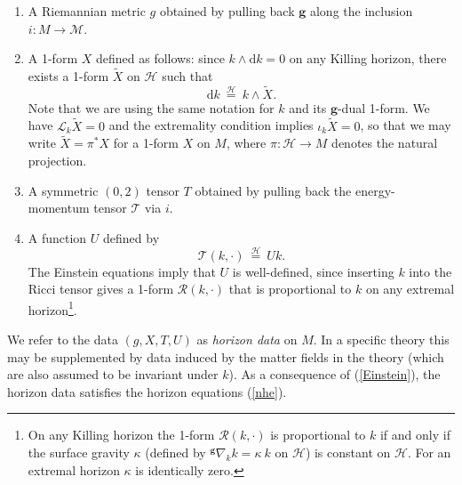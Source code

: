 \documentclass[11pt, reqno]{amsart}
\theoremstyle{plain}
\theoremstyle{definition}
\numberwithin{equation}{section}
\begin{document}
\begin{enumerate}
    \item A Riemannian metric $g$ obtained by pulling back $\textbf{g}$ along the inclusion $i: M \to \mathcal{M}$.
    \item A 1-form $X$ defined as follows: since $k \wedge \text{d}k = 0$ on any Killing horizon, there exists a 1-form $\tilde{X}$ on $\mathcal{H}$ such that 
    \begin{equation}  \label{Xdef}
    \text{d}k \:\overset{\mathcal{H}}{=}\: k \wedge \tilde{X}.
\end{equation}
Note that we are using the same notation for $k$ and its $\textbf{g}$-dual 1-form. We have $\mathcal{L}_k\tilde{X} = 0$ and the extremality condition implies  $\iota_k\tilde{X} = 0$, so that we may write $\tilde{X} = \pi^* X$ for a 1-form $X$ on $M$, where $\pi: \mathcal{H} \to M$ denotes the natural projection.
\item A symmetric $(0,2)$ tensor $T$ obtained by pulling back the energy-momentum tensor $\mathcal{T}$ via $i$.
\item A function $U$ defined by
\begin{equation} \label{U}
    \mathcal{T}(k,\cdot)\:\overset{\mathcal{H}}{=}\: Uk.
\end{equation}
The Einstein equations imply that $U$ is well-defined, since inserting $k$ into the Ricci tensor gives a 1-form $\mathcal{R}(k,\cdot)$ that is proportional to $k$ on any extremal horizon\footnote{On any Killing horizon the 1-form $\mathcal{R}(k, \cdot)$ is proportional to $k$ if and only if the surface gravity $\kappa$ (defined by $^{\textbf{g}}\nabla_k k = \kappa \:k$ on $\mathcal{H}$) is constant on $\mathcal{H}$. For an extremal horizon $\kappa$ is identically zero.}.
\end{enumerate}
We refer to the data  $(g,X,T,U)$ as \textit{horizon data} on $M$. In a specific theory this may be supplemented by data induced by the matter fields in the theory (which are also assumed to be invariant under $k$). As a consequence of (\ref{Einstein}), the horizon data satisfies the horizon equations (\ref{nhe}).
\end{document}
